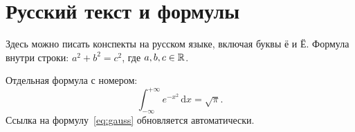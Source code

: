\section{Русский текст и формулы}
Здесь можно писать конспекты на русском языке, включая буквы ё и Ё.
Формула внутри строки: $a^2+b^2=c^2$, где $a,b,c\in\mathbb{R}$.

Отдельная формула с номером:
\begin{equation}\label{eq:gauss}
  \int_{-\infty}^{+\infty} e^{-x^2}\,\mathrm{d}x=\sqrt{\pi}.
\end{equation}
Ссылка на формулу~\eqref{eq:gauss} обновляется автоматически.
